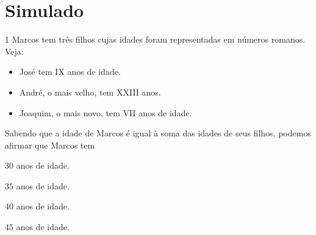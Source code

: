 
%




\chapter[Simulado 2]{Simulado}

\num{1}  Marcos tem três filhos cujas idades foram representadas em números
romanos. Veja:

\begin{itemize}
\item
  José tem IX anos de idade.
\item
  André, o mais velho, tem XXIII anos.
\item
  Joaquim, o mais novo, tem VII anos de idade.
\end{itemize}

Sabendo que a idade de Marcos é igual à soma das idades de seus
filhos, podemos afirmar que Marcos tem

\begin{multicols}{2}
\begin{escolha}
\item $30$ anos de idade.
\item $35$ anos de idade.
\item $40$ anos de idade.
\item $45$ anos de idade.
\end{escolha}
\end{multicols}

